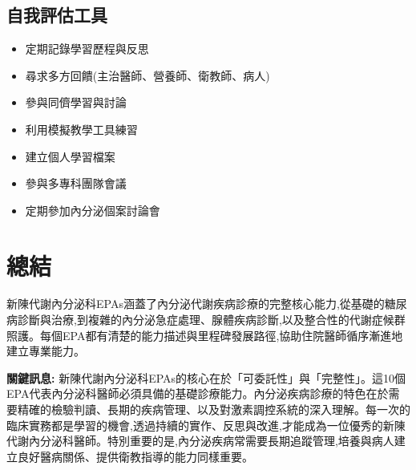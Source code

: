 \documentclass[12pt,a4paper]{article}
\begin{document}
\subsection{自我評估工具}
\begin{itemize}[nosep]
    \item 定期記錄學習歷程與反思
    \item 尋求多方回饋(主治醫師、營養師、衛教師、病人)
    \item 參與同儕學習與討論
    \item 利用模擬教學工具練習
    \item 建立個人學習檔案
    \item 參與多專科團隊會議
    \item 定期參加內分泌個案討論會
\end{itemize}

\section{總結}

新陳代謝內分泌科EPAs涵蓋了內分泌代謝疾病診療的完整核心能力,從基礎的糖尿病診斷與治療,到複雜的內分泌急症處理、腺體疾病診斷,以及整合性的代謝症候群照護。每個EPA都有清楚的能力描述與里程碑發展路徑,協助住院醫師循序漸進地建立專業能力。

\begin{importantbox}
\textbf{關鍵訊息:} 新陳代謝內分泌科EPAs的核心在於「可委託性」與「完整性」。這10個EPA代表內分泌科醫師必須具備的基礎診療能力。內分泌疾病診療的特色在於需要精確的檢驗判讀、長期的疾病管理、以及對激素調控系統的深入理解。每一次的臨床實務都是學習的機會,透過持續的實作、反思與改進,才能成為一位優秀的新陳代謝內分泌科醫師。特別重要的是,內分泌疾病常需要長期追蹤管理,培養與病人建立良好醫病關係、提供衛教指導的能力同樣重要。
\end{importantbox}

\end{document}
